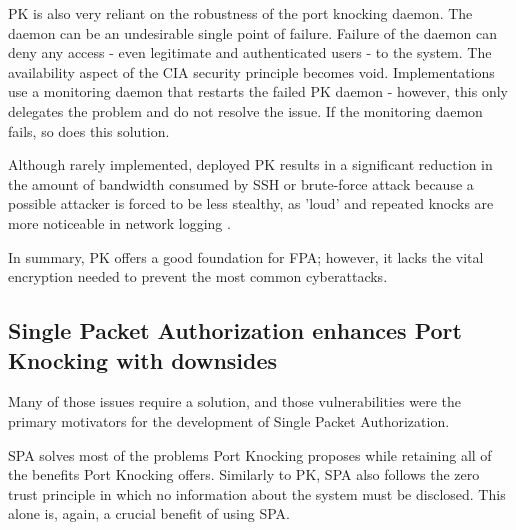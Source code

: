 PK is also very reliant on the robustness of the port knocking daemon. The daemon can be an undesirable single point of failure.  Failure of the daemon can deny any access - even legitimate and authenticated users - to the system.  The availability aspect of the CIA security principle becomes void.  Implementations use a monitoring daemon that restarts the failed PK daemon - however, this only delegates the problem and do not resolve the issue.  If the monitoring daemon fails, so does this solution.\par

Although rarely implemented, deployed PK results in a significant reduction in the amount of bandwidth consumed by SSH or brute-force attack because a possible attacker is forced to be less stealthy, as 'loud' and repeated knocks are more noticeable in network logging \cite{PKissues}.\\\par


In summary, PK offers a good foundation for FPA; however, it lacks the vital encryption needed to prevent the most common cyberattacks. \par


\subsection{Single Packet Authorization enhances Port Knocking with downsides}


Many of those issues require a solution, and those vulnerabilities were the primary motivators for the development of Single Packet Authorization.  \par
SPA solves most of the problems Port Knocking proposes while retaining all of the benefits Port Knocking offers. Similarly to PK, SPA also follows the zero trust principle in which no information about the system must be disclosed. This alone is, again, a crucial benefit of using SPA.\\\par

